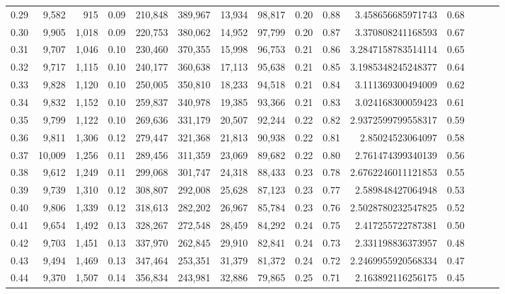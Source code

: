 \begin{tabular}{rrrrrrrrrrrrrrr}
0.29 &   9,582 &    915 &  0.09 &  210,848 &  389,967 &   13,934 &   98,817 &  0.20 &  0.88 &     3.458656685971743 &      0.68 \\
0.30 &   9,905 &  1,018 &  0.09 &  220,753 &  380,062 &   14,952 &   97,799 &  0.20 &  0.87 &     3.370808241168593 &      0.67 \\
0.31 &   9,707 &  1,046 &  0.10 &  230,460 &  370,355 &   15,998 &   96,753 &  0.21 &  0.86 &    3.2847158783514114 &      0.65 \\
0.32 &   9,717 &  1,115 &  0.10 &  240,177 &  360,638 &   17,113 &   95,638 &  0.21 &  0.85 &    3.1985348245248377 &      0.64 \\
0.33 &   9,828 &  1,120 &  0.10 &  250,005 &  350,810 &   18,233 &   94,518 &  0.21 &  0.84 &     3.111369300494009 &      0.62 \\
0.34 &   9,832 &  1,152 &  0.10 &  259,837 &  340,978 &   19,385 &   93,366 &  0.21 &  0.83 &     3.024168300059423 &      0.61 \\
0.35 &   9,799 &  1,122 &  0.10 &  269,636 &  331,179 &   20,507 &   92,244 &  0.22 &  0.82 &    2.9372599799558317 &      0.59 \\
0.36 &   9,811 &  1,306 &  0.12 &  279,447 &  321,368 &   21,813 &   90,938 &  0.22 &  0.81 &      2.85024523064097 &      0.58 \\
0.37 &  10,009 &  1,256 &  0.11 &  289,456 &  311,359 &   23,069 &   89,682 &  0.22 &  0.80 &     2.761474399340139 &      0.56 \\
0.38 &   9,612 &  1,249 &  0.11 &  299,068 &  301,747 &   24,318 &   88,433 &  0.23 &  0.78 &    2.6762246011121853 &      0.55 \\
0.39 &   9,739 &  1,310 &  0.12 &  308,807 &  292,008 &   25,628 &   87,123 &  0.23 &  0.77 &     2.589848427064948 &      0.53 \\
0.40 &   9,806 &  1,339 &  0.12 &  318,613 &  282,202 &   26,967 &   85,784 &  0.23 &  0.76 &    2.5028780232547825 &      0.52 \\
0.41 &   9,654 &  1,492 &  0.13 &  328,267 &  272,548 &   28,459 &   84,292 &  0.24 &  0.75 &     2.417255722787381 &      0.50 \\
0.42 &   9,703 &  1,451 &  0.13 &  337,970 &  262,845 &   29,910 &   82,841 &  0.24 &  0.73 &     2.331198836373957 &      0.48 \\
0.43 &   9,494 &  1,469 &  0.13 &  347,464 &  253,351 &   31,379 &   81,372 &  0.24 &  0.72 &    2.2469955920568334 &      0.47 \\
0.44 &   9,370 &  1,507 &  0.14 &  356,834 &  243,981 &   32,886 &   79,865 &  0.25 &  0.71 &     2.163892116256175 &      0.45 \\

\end{tabular}
